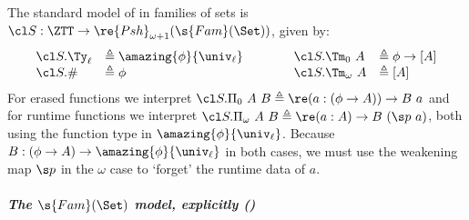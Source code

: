 \documentclass[a4paper,UKenglish,cleveref,autoref,thm-restate]{lipics-v2021}
\begin{document}
\begin{definition}\label{def:std-model} The standard
 model of \ZTT in families of sets is $\cl S : \ZTT \to \re{Psh}_{\omega + 1}(\s{Fam}(\Set))$,
 given by:
  \[
  \begin{array}{ll@{\qquad\qquad}ll}
    \cl S.\Ty_\ell &\triangleq \amazing{\phi}{\univ_\ell} &
    \cl S.\Tm_0\ A &\triangleq  \phi \to [A] \\
    \cl S.\# &\triangleq \phi &
    \cl S.\Tm_\omega\ A &\triangleq [A]
  \end{array}
  \]
For erased functions we interpret $\cl S.\Pi_0\ A\ B \triangleq \re (a : (\phi \to A))
\to B\ a$ and for runtime functions we interpret $\cl S.\Pi_\omega\ A\ B \triangleq
\re (a : A) \to B\ (\s p\ a)$, both using the function type in
$\amazing{\phi}{\univ_\ell}$. Because $B : (\phi \to A) \to
\amazing{\phi}{\univ_\ell}$ in both cases, we must use the weakening map $\s p$
in the $\omega$ case to `forget' the runtime data of $a$.
\end{definition}
   

\subparagraph{The $\s{Fam}(\Set)$ model, explicitly ()}\label{ssub:famset}
\end{document}
